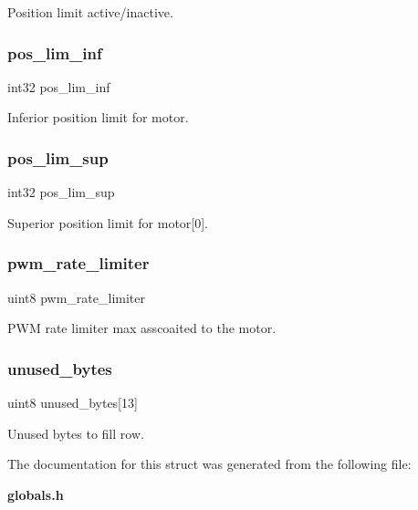 Position limit active/inactive. \mbox{\label{structst__motor_a09aaaa265df5ea6cba5a3f216f1dc2c8}} 
\subsubsection{pos\+\_\+lim\+\_\+inf}
{\footnotesize\ttfamily int32 pos\+\_\+lim\+\_\+inf}

Inferior position limit for motor. \mbox{\label{structst__motor_a981b8ec7db1222b3afbd4f1fd5da983d}} 
\subsubsection{pos\+\_\+lim\+\_\+sup}
{\footnotesize\ttfamily int32 pos\+\_\+lim\+\_\+sup}

Superior position limit for motor[0]. \mbox{\label{structst__motor_a1230396f2894c516a42a418ec34a60a1}} 
\subsubsection{pwm\+\_\+rate\+\_\+limiter}
{\footnotesize\ttfamily uint8 pwm\+\_\+rate\+\_\+limiter}

P\+WM rate limiter max asscoaited to the motor. \mbox{\label{structst__motor_a4e06ed17adfb7c69cda82526f3b6def1}} 
\subsubsection{unused\+\_\+bytes}
{\footnotesize\ttfamily uint8 unused\+\_\+bytes[13]}

Unused bytes to fill row. 

The documentation for this struct was generated from the following file\+:\begin{DoxyCompactItemize}
\item 
\textbf{ globals.\+h}\end{DoxyCompactItemize}
